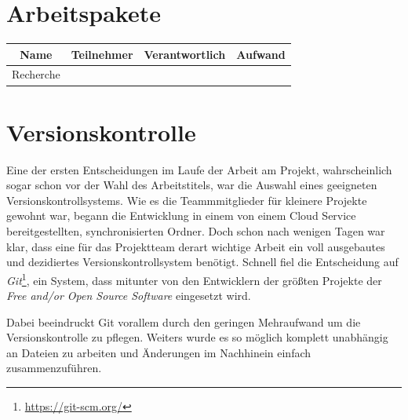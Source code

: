 \section{Arbeitspakete}
\label{sec:arbeitspakete}

\begin{tabular}{cccc}
	Name & Teilnehmer & Verantwortlich & Aufwand \\
	\hline\hline\hline
	Recherche & & & \\
	\hline\hline
\end{tabular}

\section{Versionskontrolle}
Eine der ersten Entscheidungen im Laufe der Arbeit am Projekt, wahrscheinlich sogar schon vor der Wahl des Arbeitstitels, war die Auswahl eines geeigneten Versionskontrollsystems. Wie es die Teammmitglieder für kleinere Projekte gewohnt war, begann die Entwicklung in einem von einem Cloud Service bereitgestellten, synchronisierten Ordner. Doch schon nach wenigen Tagen war klar, dass eine für das Projektteam derart wichtige Arbeit ein voll ausgebautes und dezidiertes Versionskontrollsystem benötigt. Schnell fiel die Entscheidung auf \textit{Git}\footnote{\url{https://git-scm.org/}}, ein System, dass mitunter von den Entwicklern der größten Projekte der \textit{Free and/or Open Source Software} eingesetzt wird.

Dabei beeindruckt Git vorallem durch den geringen Mehraufwand um die Versionskontrolle zu pflegen. Weiters wurde es so möglich komplett unabhängig an Dateien zu arbeiten und Änderungen im Nachhinein einfach zusammenzuführen.
